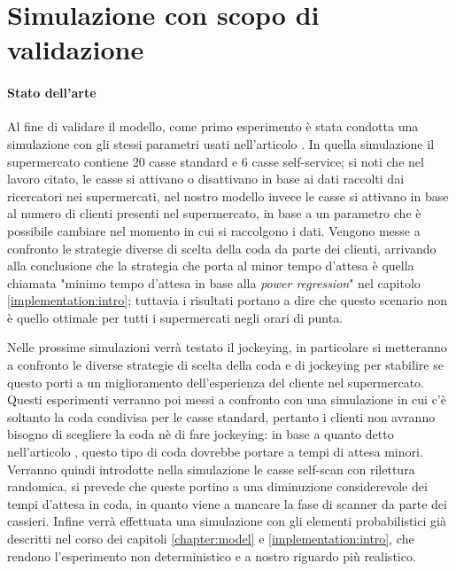 \section{Simulazione con scopo di validazione}

\paragraph{Stato dell'arte}

Al fine di validare il modello, come primo esperimento è stata condotta una simulazione con gli stessi parametri usati nell'articolo \cite{article1}. In quella simulazione il supermercato contiene 20 casse standard e 6 casse self-service; si noti che nel lavoro citato, le casse si attivano o disattivano in base ai dati raccolti dai ricercatori nei supermercati, nel nostro modello invece le casse si attivano in base al numero di clienti presenti nel supermercato, in base a un parametro che è possibile cambiare nel momento in cui si raccolgono i dati. Vengono messe a confronto le strategie diverse di scelta della coda da parte dei clienti, arrivando alla conclusione che la strategia che porta al minor tempo d'attesa è quella chiamata "minimo tempo d'attesa in base alla \textit{power regression}" nel capitolo \ref{implementation:intro}; tuttavia i risultati portano a dire che questo scenario non è quello ottimale per tutti i supermercati negli orari di punta.

Nelle prossime simulazioni verrà testato il jockeying, in particolare si metteranno a confronto le diverse strategie di scelta della coda e di jockeying per stabilire se questo porti a un miglioramento dell'esperienza del cliente nel supermercato. Questi esperimenti verranno poi messi a confronto con una simulazione in cui c'è soltanto la coda condivisa per le casse standard, pertanto i clienti non avranno bisogno di scegliere la coda nè di fare jockeying: in base a quanto detto nell'articolo \cite{yanagisawa2011methods}, questo tipo di coda dovrebbe portare a tempi di attesa minori. 
Verranno quindi introdotte nella simulazione le casse self-scan con rilettura randomica, si prevede che queste portino a una diminuzione considerevole dei tempi d'attesa in coda, in quanto viene a mancare la fase di scanner da parte dei cassieri. Infine verrà effettuata una simulazione con gli elementi probabilistici già descritti nel corso dei capitoli \ref{chapter:model} e \ref{implementation:intro}, che rendono l'esperimento non deterministico e a nostro riguardo più realistico.


